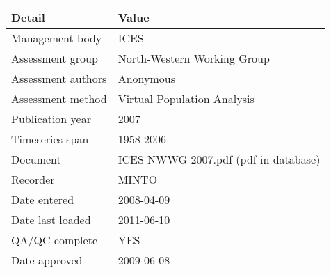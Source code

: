\begin{table}[htb]
\centering
\begin{tabular}{ll}
\toprule
Detail & Value \\
\midrule
Management body    & ICES                                 \\
Assessment group   & North-Western Working Group          \\
Assessment authors & Anonymous                            \\
Assessment method  & Virtual Population Analysis          \\
Publication year   & 2007                                 \\
Timeseries span    & 1958-2006                            \\
Document           & ICES-NWWG-2007.pdf (pdf in database) \\
Recorder           & MINTO                                \\
Date entered       & 2008-04-09                           \\
Date last loaded   & 2011-06-10                           \\
QA/QC complete     & YES                                  \\
Date approved      & 2009-06-08                           \\
\bottomrule
\end{tabular}
\label{tab:assessdet}
\end{table}
